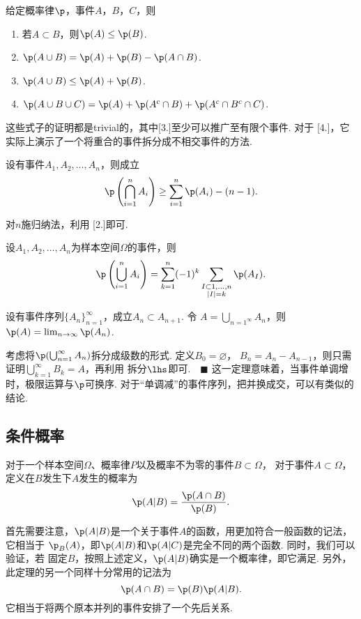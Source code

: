   \begin{thm}[概率律的性质]
    \label{thm: 概率律的性质}
    给定概率律$\p$，事件$A$，$B$，$C$，则
    \begin{enumerate}
      \item 若$A\subset B$，则$\p(A)\le \p(B)$.
      \item $\p(A\cup B) = \p(A) + \p(B) - \p(A\cap B)$.
      \item $\p(A\cup B) \le \p(A) + \p(B)$.
      \item $\p(A\cup B\cup C) = \p(A) + \p(A^c\cap B) +
        \p(A^c \cap B^c \cap C)$.
    \end{enumerate}
  \end{thm}
  \remark
    这些式子的证明都是trivial的，其中[3.]至少可以推广至有限个事件. 对于
    [4.]，它实际上演示了一个将重合的事件拆分成不相交事件的方法.

  \begin{lemma}[Bonferroni不等式]
    设有事件$A_1, A_2, \dots, A_n$，则成立
    \[
      \p\left(\bigcap_{i=1}^n A_i\right) \ge \sum_{i=1}^n\p(A_i) - (n-1).
    \]
  \end{lemma}
  \proof
    对$n$施归纳法，利用 [2.]即可.

  \begin{thm}[容斥原理]
    设$A_1,A_2,\dots, A_n$为样本空间$\Omega$的事件，则
    \[
      \p\left( \bigcup_{i=1}^n A_i \right) =
      \sum_{k=1}^n (-1)^k
      \sum_{\substack{I\subset{1,\dots,n}\\|I|=k}}\p(A_I).
    \]
  \end{thm}

  \begin{thm}[连续概率]
    \label{thm: 连续概率}
    设有事件序列$\{A_n\}_{n=1}^\infty$，成立$A_n\subset A_{n+1}$. 令
    $A=\bigcup_{n=1^\infty}A_n$，则$\p(A)=\lim_{n\to\infty}\p(A_n)$.
  \end{thm}
  \proof
    考虑将$\p(\bigcup_{n=1}^\infty A_n)$拆分成级数的形式. 定义$B_0=\varnothing$，
    $B_n = A_n - A_{n-1}$，则只需证明$\bigcup_{k=1}^\infty B_k = A$，再利用
    拆分$\lhs$即可.$\quad\blacksquare$
  \remark
    这一定理意味着，当事件单调增时，极限运算与$\p$可换序.
    对于“单调减”的事件序列，把并换成交，可以有类似的结论.

\subsection{条件概率}
  
  \begin{defi}[条件概率]
    对于一个样本空间$\Omega$、概率律$P$以及概率不为零的事件$B\subset\Omega$，
    对于事件$A\subset\Omega$，定义在$B$发生下$A$发生的概率为
    \[
      \p(A|B) = \frac{\p(A\cap B)}{\p(B)}.
    \]
  \end{defi}
  \remark
    首先需要注意，$\p(A|B)$是一个关于事件$A$的函数，用更加符合一般函数的记法，它相当于
    $\p_B(A)$，即$\p(A|B)$和$\p(A|C)$是完全不同的两个函数. 同时，我们可以验证，若
    固定$B$，按照上述定义，$\p(A|B)$确实是一个概率律，即它满足.
    另外，此定理的另一个同样十分常用的记法为
    \[
      \p(A\cap B) = \p(B)\p(A|B).
    \]
    它相当于将两个原本并列的事件安排了一个先后关系.

